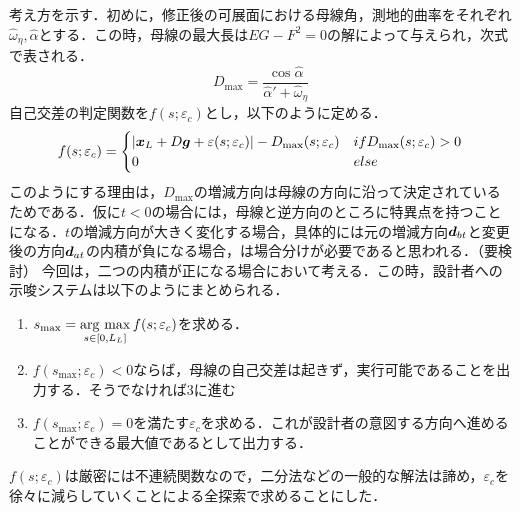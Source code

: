 \documentclass[11pt]{jsarticle}
\begin{document}
			考え方を示す．初めに，修正後の可展面における母線角，測地的曲率をそれぞれ$ \hat{\omega}_{\eta}, \hat{\alpha} $とする．この時，母線の最大長は$ EG-F^2 =0$の解によって与えられ，次式で表される．
			\begin{equation}\label{eq:DistMax}
				D_{\max} = \frac{\cos \hat{\alpha}}{\hat{\alpha}' + \hat{\omega}_{\eta}}
			\end{equation}
			自己交差の判定関数を$ f(s;\varepsilon_c)$とし，以下のように定める．
			\begin{equation}\label{eq:judgeFunc}
				f(s;\varepsilon_c) =
				\begin{cases}
				 |\boldsymbol{x}_L + D\boldsymbol{g} + \varepsilon(s;\varepsilon_c)| - D_{\max}(s;\varepsilon_c) & if D_{\max}(s;\varepsilon_c)>0 \\
				 0 & else
				 \end{cases}
			\end{equation}
			このようにする理由は，$ D_{\max} $の増減方向は母線の方向に沿って決定されているためである．仮に$ t<0 $の場合には，母線と逆方向のところに特異点を持つことになる．$ t $の増減方向が大きく変化する場合，具体的には元の増減方向$ \boldsymbol{d}_{bt} $と変更後の方向$ \boldsymbol{d}_{at} $の内積が負になる場合，は場合分けが必要であると思われる．（要検討）
			今回は，二つの内積が正になる場合において考える．この時，設計者への示唆システムは以下のようにまとめられる．
			\begin{enumerate}
				\item $ s_{\max} = \mathop{\rm arg~max}\limits_{s\in [0,L_L]} f(s;\varepsilon_c) $を求める．
				\item $ f(s_{\max};\varepsilon_c) <0$ならば，母線の自己交差は起きず，実行可能であることを出力する．そうでなければ3に進む
				\item $ f(s_{\max};\varepsilon_c) = 0 $を満たす$ \varepsilon_c $を求める．これが設計者の意図する方向へ進めることができる最大値であるとして出力する．
			\end{enumerate}
			$ f(s;\varepsilon_c)$は厳密には不連続関数なので，二分法などの一般的な解法は諦め，$ \varepsilon_c $を徐々に減らしていくことによる全探索で求めることにした．
			
\end{document}
